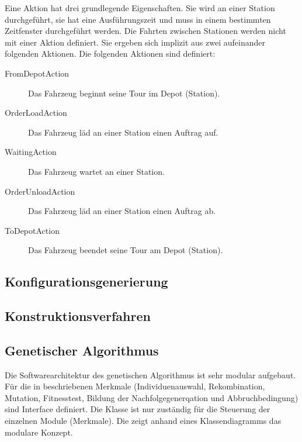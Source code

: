 Eine Aktion hat drei grundlegende Eigenschaften. Sie wird an einer Station durchgeführt, sie hat eine Ausführungszeit und muss in einem bestimmten Zeitfenster durchgeführt werden. Die Fahrten zwischen Stationen werden nicht mit einer Aktion definiert. Sie ergeben sich implizit aus zwei aufeinander folgenden Aktionen. Die folgenden Aktionen sind definiert:
\begin{description}
 \item[FromDepotAction] Das Fahrzeug beginnt seine Tour im Depot (Station). 
 \item[OrderLoadAction] Das Fahrzeug läd an einer Station einen Auftrag auf.
 \item[WaitingAction] Das Fahrzeug wartet an einer Station.
 \item[OrderUnloadAction] Das Fahrzeug läd an einer Station einen Auftrag ab.
 \item[ToDepotAction] Das Fahrzeug beendet seine Tour am Depot (Station).
\end{description}


\subsection{Konfigurationsgenerierung}

\subsection{Konstruktionsverfahren}

\subsection{Genetischer Algorithmus}
Die Softwarearchitektur des genetischen Algorithmus ist sehr modular aufgebaut. Für die in  beschriebenen Merkmale (Individuenauswahl, Rekombination, Mutation, Fitnesstest, Bildung der Nachfolgegenerqation und Abbruchbedingung) sind Interface definiert. Die Klasse  ist nur zuständig für die Steuerung der einzelnen Module (Merkmale). Die  zeigt anhand eines Klassendiagramms das modulare Konzept.
